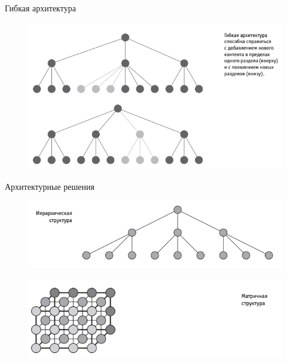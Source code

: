 \documentclass{beamer}
\begin{document}
\begin{frame}[t]{Гибкая архитектура}
\begin{figure}[h]
\centering
\includegraphics[scale=0.6]{images/lec03-pic09.png}
\end{figure}
\end{frame} 

\begin{frame}[t]{Архитектурные решения}
\begin{figure}[h]
\centering
\includegraphics[scale=0.6]{images/lec03-pic10.png}
\end{figure}
\begin{figure}[h]
\centering
\includegraphics[scale=0.6]{images/lec03-pic11.png}
\end{figure}
\end{frame} 
\end{document}
